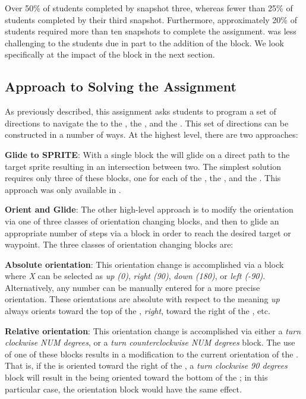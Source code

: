 Over 50\% of \stwo{} students completed by snapshot three, whereas fewer than
25\% of \sone{} students completed by their third snapshot. Furthermore,
approximately 20\% of \sone{} \com{} students required more than ten snapshots
to complete the assignment. \stwo{} was less challenging to the students due in
part to the addition of the \glideto{} block. We look specifically at the
impact of the \glideto{} block in the next section.

\subsection{Approach to Solving the Assignment}
As previously described, this assignment asks students to program a set of
directions to navigate the \net{} to \catch{} the \bear{}, the \horse{},
and the \zebra{}. This set of directions can be constructed in a number of
ways. At the highest level, there are two approaches:

\textbf{Glide to SPRITE}: With a single \glideto{} block the \net{} will glide
on a direct path to the target sprite resulting in an intersection between
two. The simplest \com{} solution requires only three of these blocks, one for
each of the \bear{}, the \horse{}, and the \zebra{}. This approach was only
available in \stwo{}.

\textbf{Orient and Glide}: The other high-level approach is to modify the
 orientation via one of three classes of orientation changing blocks,
and then to glide an appropriate number of steps via a \glideDIST{} block in
order to reach the desired target or waypoint. The three classes of orientation
changing blocks are:

\textbf{Absolute orientation}: This orientation change is accomplished via a
\pointDIR{} block where \emph{X} can be selected as \emph{up (0)}, \emph{right
  (90)}, \emph{down (180)}, or \emph{left (-90)}. Alternatively, any number can
be manually entered for a more precise orientation. These orientations are
absolute with respect to the \stage{} meaning \emph{up} always orients toward
the top of the \stage{}, \emph{right}, toward the right of the \stage{}, etc.

\textbf{Relative orientation}: This orientation change is accomplished via
either a \emph{turn clockwise NUM degrees}, or a \emph{turn counterclockwise
  NUM degrees} block. The use of one of these blocks results in a modification
to the current orientation of the \net{}. That is, if the \net{} is oriented
toward the right of the \stage{}, a \emph{turn clockwise 90 degrees} block will
result in the \net{} being oriented toward the bottom of the \stage{}; in this
particular case, the \abs{} orientation block \pointDIR[down]{} would have the
same effect.

